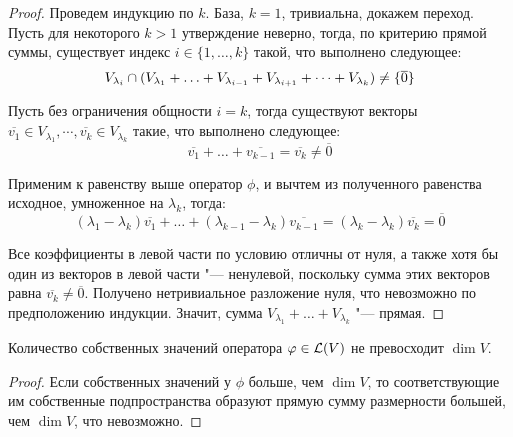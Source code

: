 \begin{proof}
	Проведем индукцию по $k$. База, $k = 1$, тривиальна, докажем переход. Пусть для некоторого $k > 1$ утверждение неверно, тогда, по критерию прямой суммы, существует индекс $i \in \{1, \dots, k\}$ такой, что выполнено следующее:
	\[ V_{\lambda_i} \cap (V_{\lambda_1} + \dots \hm{+} V_{\lambda_{i - 1}} + V_{\lambda_{i + 1}} + \dots + V_{\lambda_k}) \ne \{\overline{0}\}\]
	
	Пусть без ограничения общности $i = k$, тогда существуют векторы $\overline{v_1} \in V_{\lambda_1}, \cdots, \overline{v_k} \in V_{\lambda_k}$ такие, что выполнено следующее:
	\[\overline{v_1} + \dots + \overline{v_{k - 1}} = \overline{v_k} \ne \overline{0}\]
	
	Применим к равенству выше оператор $\phi$, и вычтем из полученного равенства исходное, умноженное на $\lambda_k$, тогда:
	\[(\lambda_1 - \lambda_k)\overline{v_1} + \dots + (\lambda_{k - 1} - \lambda_k)\overline{v_{k - 1}} = (\lambda_k - \lambda_k)\overline{v_k} = \overline{0}\]
	
	Все коэффициенты в левой части по условию отличны от нуля, а также хотя бы один из векторов в левой части "--- ненулевой, поскольку сумма этих векторов равна $\overline{v_k} \ne \overline{0}$. Получено нетривиальное разложение нуля, что невозможно по предположению индукции. Значит, сумма $V_{\lambda_1} + \dots + V_{\lambda_k}$ "--- прямая.
\end{proof}

\begin{corollary}
	Количество собственных значений оператора $\varphi \in \mathcal L (V)$ не превосходит $\dim{V}$.
\end{corollary}

\begin{proof}
	Если собственных значений у $\phi$ больше, чем $\dim{V}$, то соответствующие им собственные подпространства образуют прямую сумму размерности большей, чем $\dim{V}$, что невозможно.
\end{proof}

